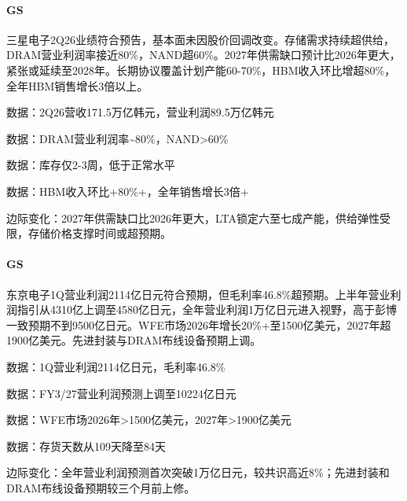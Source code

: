 \documentclass[11pt]{ctexart}
\begin{document}
\paragraph{GS} 三星电子2Q26业绩符合预告，基本面未因股价回调改变。存储需求持续超供给，DRAM营业利润率接近80\%，NAND超60\%。2027年供需缺口预计比2026年更大，紧张或延续至2028年。长期协议覆盖计划产能60-70\%，HBM收入环比增超80\%，全年HBM销售增长3倍以上。
{\small\color{refgray}数据：2Q26营收171.5万亿韩元，营业利润89.5万亿韩元\par}
{\small\color{refgray}数据：DRAM营业利润率\textasciitilde{}80\%，NAND>60\%\par}
{\small\color{refgray}数据：库存仅2-3周，低于正常水平\par}
{\small\color{refgray}数据：HBM收入环比+80\%+，全年销售增长3倍+\par}
{\small\color{refgray}边际变化：2027年供需缺口比2026年更大，LTA锁定六至七成产能，供给弹性受限，存储价格支撑时间或超预期。\par}
\paragraph{GS} 东京电子1Q营业利润2114亿日元符合预期，但毛利率46.8\%超预期。上半年营业利润指引从4310亿上调至4580亿日元，全年营业利润1万亿日元进入视野，高于彭博一致预期不到9500亿日元。WFE市场2026年增长20\%+至1500亿美元，2027年超1900亿美元。先进封装与DRAM布线设备预期上调。
{\small\color{refgray}数据：1Q营业利润2114亿日元，毛利率46.8\%\par}
{\small\color{refgray}数据：FY3/27营业利润预测上调至10224亿日元\par}
{\small\color{refgray}数据：WFE市场2026年>1500亿美元，2027年>1900亿美元\par}
{\small\color{refgray}数据：存货天数从109天降至84天\par}
{\small\color{refgray}边际变化：全年营业利润预测首次突破1万亿日元，较共识高近8\%；先进封装和DRAM布线设备预期较三个月前上修。\par}
\end{document}
